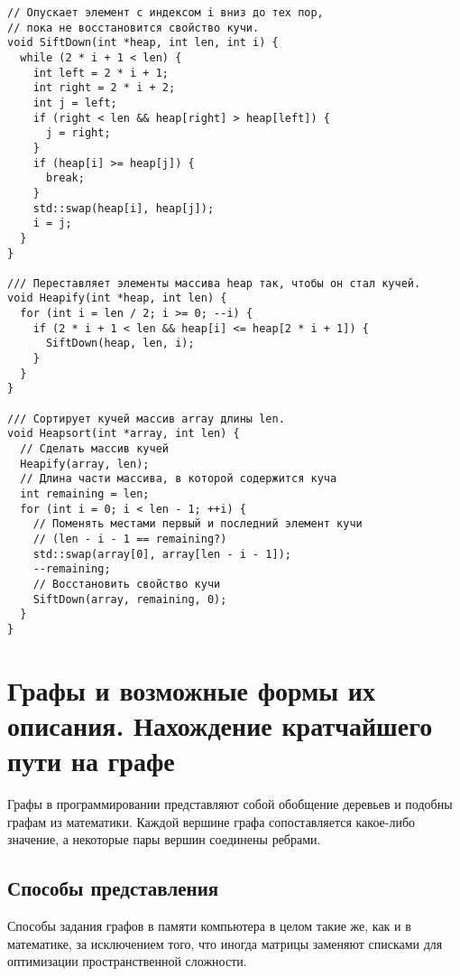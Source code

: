 \begin{verbatim}
// Опускает элемент с индексом i вниз до тех пор,
// пока не восстановится свойство кучи.
void SiftDown(int *heap, int len, int i) {
  while (2 * i + 1 < len) {
    int left = 2 * i + 1;
    int right = 2 * i + 2;
    int j = left;
    if (right < len && heap[right] > heap[left]) {
      j = right;
    }
    if (heap[i] >= heap[j]) {
      break;
    }
    std::swap(heap[i], heap[j]);
    i = j;
  }
}

/// Переставляет элементы массива heap так, чтобы он стал кучей.
void Heapify(int *heap, int len) {
  for (int i = len / 2; i >= 0; --i) {
    if (2 * i + 1 < len && heap[i] <= heap[2 * i + 1]) {
      SiftDown(heap, len, i);
    }
  }
}

/// Сортирует кучей массив array длины len.
void Heapsort(int *array, int len) {
  // Сделать массив кучей
  Heapify(array, len);
  // Длина части массива, в которой содержится куча
  int remaining = len;
  for (int i = 0; i < len - 1; ++i) {
    // Поменять местами первый и последний элемент кучи
    // (len - i - 1 == remaining?)
    std::swap(array[0], array[len - i - 1]);
    --remaining;
    // Восстановить свойство кучи
    SiftDown(array, remaining, 0);
  }
}
\end{verbatim}
\section{Графы и возможные формы их описания. Нахождение кратчайшего пути на графе}
Графы в программировании представляют собой обобщение деревьев и подобны графам из математики.
Каждой вершине графа сопоставляется какое-либо значение, а некоторые пары вершин соединены
ребрами.

\subsection{Способы представления}
Способы задания графов в памяти компьютера в целом такие же, как и в математике,
за исключением того, что иногда матрицы заменяют списками для оптимизации
пространственной сложности.

